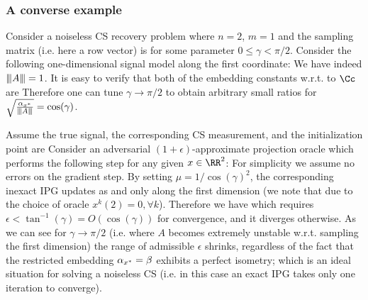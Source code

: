 \subsubsection*{A converse example}
Consider a noiseless CS recovery problem where $n =2$, $m=1$ and the sampling matrix (i.e. here a row vector) is
for some parameter $0\leq\gamma<\pi/2$. Consider the following one-dimensional signal model along the first coordinate:
We have indeed ${\left\vert\kern-0.25ex\left\vert\kern-0.25ex\left\vert A \right\vert\kern-0.25ex\right\vert\kern-0.25ex\right\vert}=1$. It is easy to verify that both of the embedding constants w.r.t. to $\Cc$ are
Therefore one can tune $\gamma\rightarrow \pi/2$ to obtain arbitrary small ratios for $\sqrt{\frac{\alpha_{x^*}}{{\left\vert\kern-0.25ex\left\vert\kern-0.25ex\left\vert A \right\vert\kern-0.25ex\right\vert\kern-0.25ex\right\vert}}}=\cos(\gamma)$. 

Assume the true signal, the corresponding CS measurement,  and the initialization point are
Consider an adversarial $(1+\epsilon)$-approximate projection oracle which performs the following step for any given $x\in \RR^2$:
For simplicity we assume no errors on the gradient step. 	
By setting $\mu=1/\cos(\gamma)^2$, the corresponding inexact IPG updates as 
and only along the first dimension (we note that due to the choice of oracle $x^k(2)=0, \forall k$). Therefore we have
which requires $\epsilon<\tan^{-1}(\gamma)=O(\cos(\gamma))$ for convergence, and it diverges otherwise. As we can see for $\gamma\rightarrow \pi/2$  (i.e. where $A$ becomes extremely unstable w.r.t. sampling the first dimension) the range of admissible $\epsilon$ shrinks, regardless of the fact that the restricted embedding $\alpha_{x^*}=\beta$ exhibits a  perfect isometry; which is an ideal situation for solving a noiseless CS (i.e. in this case an exact IPG takes only one iteration to converge).
